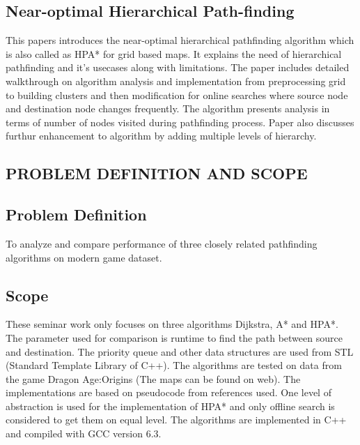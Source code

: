 \documentclass[a4paper, 12pt]{article}
\begin{document}
\subsection{Near-optimal Hierarchical Path-finding}
\hspace{1.2cm} 
This papers introduces the near-optimal hierarchical pathfinding algorithm which is also called as HPA* for grid based maps. It explains the need of hierarchical pathfinding and it's usecases along with limitations. The paper includes detailed walkthrough on algorithm analysis and implementation from preprocessing grid to building clusters and then modification for online searches where source node and destination node changes frequently. The algorithm presents analysis in terms of number of nodes visited during pathfinding process. Paper also discusses furthur enhancement to algorithm by adding multiple levels of hierarchy.

\leavevmode


\newpage
\begin{center}
\section{PROBLEM DEFINITION AND SCOPE}
\end{center}

\subsection{Problem Definition}

\hspace{1.5cm} To analyze and compare performance of three closely related pathfinding algorithms on modern game dataset.

\subsection{Scope}

\hspace{1.5cm} These seminar work only focuses on three algorithms Dijkstra, A* and HPA*. The parameter used for comparison is
runtime to find the path between source and destination. The priority queue and other data structures are used from STL (Standard Template Library of C++). The algorithms are tested on data from the game Dragon Age:Origins (The maps can be found on web). The implementations are based on pseudocode from references used. One level of abstraction is used for the implementation of HPA* and only offline search is considered to get them on equal level.  The algorithms are implemented in C++ and compiled with GCC version 6.3.
\\
\end{document}
